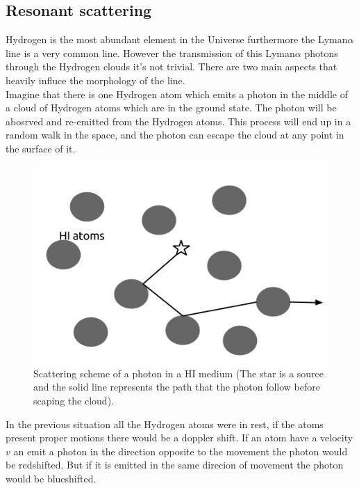\subsection{Resonant scattering}\label{sec:resonant}

Hydrogen is the most abundant element in the Universe furthermore
the Lyman$\alpha$ line is a very common line. However the transmission of this
Lyman$\alpha$ photons through the Hydrogen clouds it's not trivial. There 
are two main aspects that heavily influce the morphology of the line.\\

Imagine that  there is one Hydrogen atom which emits 
a \ly photon in the middle of a cloud of Hydrogen atoms which are in the
ground state. The \ly photon will be abosrved and re-emitted from 
the Hydrogen atoms. This process will end up in a random walk in the space,
and the photon can escape the cloud at any point in the surface of it.\\

\begin{figure}[H]\label{fig:rw}
\begin{center}
\includegraphics[scale=0.4]{../Figures/randomwalk.png}
\end{center}\caption{Scattering scheme of a \ly photon in a HI medium
(The star is a \ly source and the solid line represents the path that
the \ly photon follow before scaping the cloud).}
\end{figure}


In the previous situation all the Hydrogen atoms were in rest, if the atoms
present proper motions there would be a doppler shift. If an atom have a velocity 
$v$ an emit a \ly photon in the direction opposite to the movement the \ly photon 
would be redshifted. But if it is emitted in the same direcion of movement the
\ly photon would be blueshifted.    

